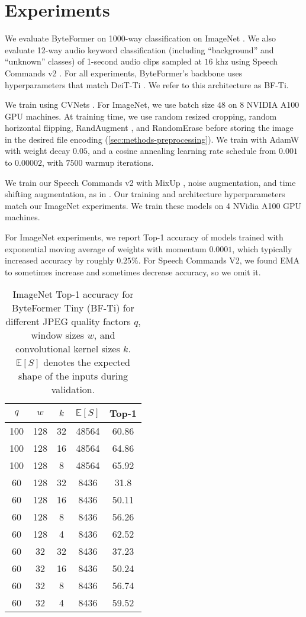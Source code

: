\section{Experiments} \label{sec:experiments}
We evaluate ByteFormer on 1000-way classification on ImageNet \cite{imagenet}. We also evaluate 12-way audio keyword classification (including ``background'' and ``unknown'' classes) of 1-second audio clips sampled at $16$ khz using Speech Commands v2 \cite{speechcommands}. For all experiments, ByteFormer's backbone uses hyperparameters that match DeiT-Ti \cite{deit}. We refer to this architecture as BF-Ti.

We train using CVNets \cite{cvnets}. For ImageNet, we use batch size $48$ on 8 NVIDIA A100 GPU machines. At training time, we use random resized cropping, random horizontal flipping, RandAugment \cite{randaugment}, and RandomErase \cite{random-erase} before storing the image in the desired file encoding (\autoref{sec:methods-preprocessing}). We train with AdamW \cite{adamw} with weight decay $0.05$, and a cosine annealing learning rate schedule from $0.001$ to $0.00002$, with $7500$ warmup iterations.

We train our Speech Commands v2 with MixUp \cite{mixup}, noise augmentation, and time shifting augmentation, as in \cite{conv-mixer}. Our training and architecture hyperparameters match our ImageNet experiments. We train these models on 4 NVidia A100 GPU machines.

For ImageNet experiments, we report Top-1 accuracy of models trained with exponential moving average of weights with momentum $0.0001$, which typically increased accuracy by roughly $0.25\%$. For Speech Commands V2, we found EMA to sometimes increase and sometimes decrease accuracy, so we omit it.
\begin{table}
\centering
\begin{tabular}{ ccccc }
  \toprule[1.5pt]
  $q$ & $w$ & $k$ & $\mathbb{E}[S]$ & \textbf{Top-1} \\ 
  \midrule[1.25pt] 
  100 & 128 & 32 & 48564 & 60.86\\ 
  100 & 128 & 16 & 48564 & 64.86\\ 
  100 & 128 & 8 & 48564 & 65.92 \\
  \midrule
  60 & 128 & 32 & 8436  & 31.8 \\ 
  60 & 128 & 16  & 8436 & 50.11\\
  60 & 128 & 8  & 8436 & 56.26\\ 
  60 & 128 & 4  & 8436 & 62.52 \\ 
  \midrule
  60 & 32 & 32  & 8436 & 37.23\\ 
  60 & 32 & 16  & 8436 & 50.24\\ 
  60 & 32 & 8  & 8436 & 56.74\\
  60 & 32 & 4  & 8436 & 59.52 \\ 
  \bottomrule[1.5pt]
\end{tabular}
\caption{
  ImageNet Top-1 accuracy for ByteFormer Tiny (BF-Ti) for different JPEG quality factors $q$, window sizes $w$, and convolutional kernel sizes $k$. $\mathbb{E}[S]$ denotes the expected shape of the inputs during validation.
}
\label{table:jpeg-wk}
\end{table}
